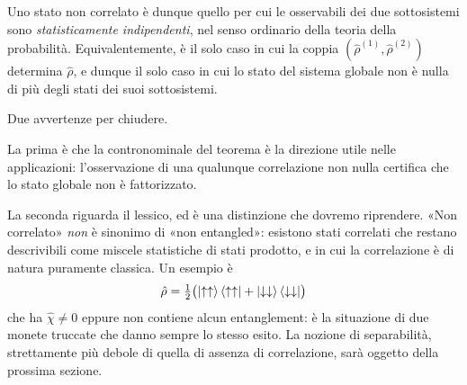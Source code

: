 Uno stato non correlato è dunque quello per cui le osservabili dei due
sottosistemi sono \emph{statisticamente indipendenti}, nel senso
ordinario della teoria della probabilità. Equivalentemente, è il solo
caso in cui la coppia $(\hat{\rho}^{(1)}, \hat{\rho}^{(2)})$ determina
$\hat{\rho}$, e dunque il solo caso in cui lo stato del sistema globale
non è nulla di più degli stati dei suoi sottosistemi.

Due avvertenze per chiudere.

La prima è che la contronominale del teorema è la direzione utile nelle
applicazioni: l'osservazione di una qualunque correlazione non nulla
certifica che lo stato globale non è fattorizzato.

La seconda riguarda il lessico, ed è una distinzione che dovremo
riprendere. «Non correlato» \emph{non} è sinonimo di «non entangled»:
esistono stati correlati che restano descrivibili come miscele statistiche
di stati prodotto, e in cui la correlazione è di natura puramente
classica. Un esempio è
%
\begin{equation}
    \hat{\rho} = \tfrac{1}{2} \bigl(
    \ket{{\uparrow}{\uparrow}} \bra{{\uparrow}{\uparrow}}
    + \ket{{\downarrow}{\downarrow}} \bra{{\downarrow}{\downarrow}}
    \bigr)
    \label{eq:correlazione-classica}
\end{equation}
%
che ha $\hat{\chi} \neq 0$ eppure non contiene alcun entanglement: è la
situazione di due monete truccate che danno sempre lo stesso esito. La
nozione di separabilità, strettamente più debole di quella di assenza di
correlazione, sarà oggetto della prossima sezione.


